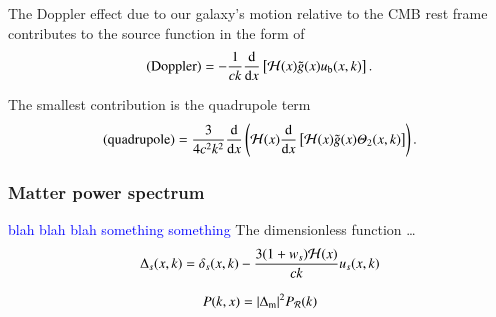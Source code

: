     The Doppler effect due to our galaxy's motion relative to the CMB rest frame contributes to the source function in the form of
    \begin{equation}
        \text{(Doppler)} = - \frac{1}{ck} \dv{}{x} \left[\mathcal{H}(x) \tilde{g}(x) u_\mathrm{b}(x,k) \right].
    \end{equation}

    The smallest contribution is the quadrupole term 
    \begin{equation}
        \text{(quadrupole)} =  \frac{3}{4c^2k^2} \dv{}{x} \left(\mathcal{H}(x) \dv{}{x} \left[ \mathcal{H}(x) \tilde{g}(x) \varTheta_2(x,k) \right] \right).
    \end{equation}



\subsubsection{Matter power spectrum}
    \textcolor{blue}{blah blah blah something something}
    The dimensionless function \dots
    \begin{equation}\label{mil4:theo:eq:Delta_s_of_x_k}
        \Delta_s (x,k) = \delta_s(x,k) - \frac{3(1+w_s)\mathcal{H}(x)}{ck}u_s(x,k)
    \end{equation}

    \begin{equation}\label{mil4:theo:eq:matter_power_spectrum}
        P(k,x) = \abs{\Delta_\mathrm{m}}^2 P_\mathcal{R}(k)
    \end{equation}


    